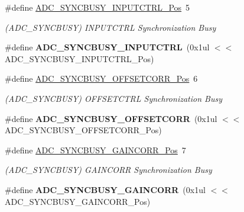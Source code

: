 \begin{DoxyCompactItemize}
\item 
\hypertarget{group___s_a_m_l21___a_d_c_gaddec2d03757fac1e6e3ba43ca28c58d3}{}\#define \hyperlink{group___s_a_m_l21___a_d_c_gaddec2d03757fac1e6e3ba43ca28c58d3}{A\+D\+C\+\_\+\+S\+Y\+N\+C\+B\+U\+S\+Y\+\_\+\+I\+N\+P\+U\+T\+C\+T\+R\+L\+\_\+\+Pos}~5\label{group___s_a_m_l21___a_d_c_gaddec2d03757fac1e6e3ba43ca28c58d3}

\begin{DoxyCompactList}\small\item\em (A\+D\+C\+\_\+\+S\+Y\+N\+C\+B\+U\+S\+Y) I\+N\+P\+U\+T\+C\+T\+R\+L Synchronization Busy \end{DoxyCompactList}\item 
\hypertarget{group___s_a_m_l21___a_d_c_ga76c95b9aebf618693074aaeee4bb6f2a}{}\#define {\bfseries A\+D\+C\+\_\+\+S\+Y\+N\+C\+B\+U\+S\+Y\+\_\+\+I\+N\+P\+U\+T\+C\+T\+R\+L}~(0x1ul $<$$<$ A\+D\+C\+\_\+\+S\+Y\+N\+C\+B\+U\+S\+Y\+\_\+\+I\+N\+P\+U\+T\+C\+T\+R\+L\+\_\+\+Pos)\label{group___s_a_m_l21___a_d_c_ga76c95b9aebf618693074aaeee4bb6f2a}

\item 
\hypertarget{group___s_a_m_l21___a_d_c_gaac3ac5e8cc9af9b37763d6ce8bdf4b9d}{}\#define \hyperlink{group___s_a_m_l21___a_d_c_gaac3ac5e8cc9af9b37763d6ce8bdf4b9d}{A\+D\+C\+\_\+\+S\+Y\+N\+C\+B\+U\+S\+Y\+\_\+\+O\+F\+F\+S\+E\+T\+C\+O\+R\+R\+\_\+\+Pos}~6\label{group___s_a_m_l21___a_d_c_gaac3ac5e8cc9af9b37763d6ce8bdf4b9d}

\begin{DoxyCompactList}\small\item\em (A\+D\+C\+\_\+\+S\+Y\+N\+C\+B\+U\+S\+Y) O\+F\+F\+S\+E\+T\+C\+T\+R\+L Synchronization Busy \end{DoxyCompactList}\item 
\hypertarget{group___s_a_m_l21___a_d_c_ga2ee956a5bfbc4f8c8a6bcbaa6852df52}{}\#define {\bfseries A\+D\+C\+\_\+\+S\+Y\+N\+C\+B\+U\+S\+Y\+\_\+\+O\+F\+F\+S\+E\+T\+C\+O\+R\+R}~(0x1ul $<$$<$ A\+D\+C\+\_\+\+S\+Y\+N\+C\+B\+U\+S\+Y\+\_\+\+O\+F\+F\+S\+E\+T\+C\+O\+R\+R\+\_\+\+Pos)\label{group___s_a_m_l21___a_d_c_ga2ee956a5bfbc4f8c8a6bcbaa6852df52}

\item 
\hypertarget{group___s_a_m_l21___a_d_c_ga5414d2085af1455400787e2cb2bace4c}{}\#define \hyperlink{group___s_a_m_l21___a_d_c_ga5414d2085af1455400787e2cb2bace4c}{A\+D\+C\+\_\+\+S\+Y\+N\+C\+B\+U\+S\+Y\+\_\+\+G\+A\+I\+N\+C\+O\+R\+R\+\_\+\+Pos}~7\label{group___s_a_m_l21___a_d_c_ga5414d2085af1455400787e2cb2bace4c}

\begin{DoxyCompactList}\small\item\em (A\+D\+C\+\_\+\+S\+Y\+N\+C\+B\+U\+S\+Y) G\+A\+I\+N\+C\+O\+R\+R Synchronization Busy \end{DoxyCompactList}\item 
\hypertarget{group___s_a_m_l21___a_d_c_ga29c1398eebf9ca07e130a1b5dfcf467d}{}\#define {\bfseries A\+D\+C\+\_\+\+S\+Y\+N\+C\+B\+U\+S\+Y\+\_\+\+G\+A\+I\+N\+C\+O\+R\+R}~(0x1ul $<$$<$ A\+D\+C\+\_\+\+S\+Y\+N\+C\+B\+U\+S\+Y\+\_\+\+G\+A\+I\+N\+C\+O\+R\+R\+\_\+\+Pos)\label{group___s_a_m_l21___a_d_c_ga29c1398eebf9ca07e130a1b5dfcf467d}


\end{DoxyCompactItemize}
